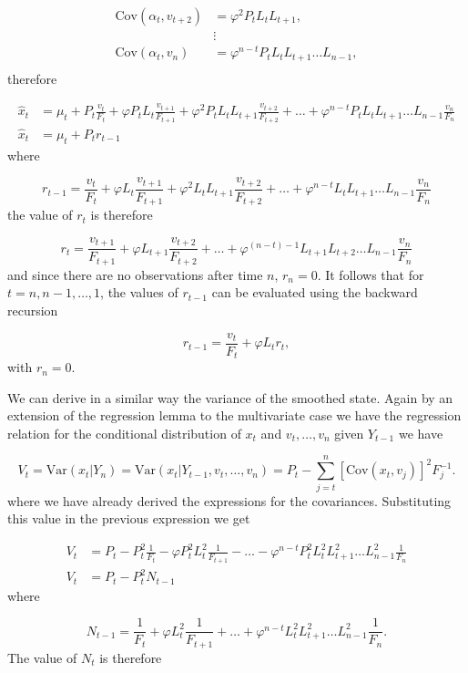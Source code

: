 \documentclass[11pt,a4paper]{article}
\newcommand{\var}{\mathrm{Var}}
\newcommand{\cov}{\mathrm{Cov}}
\begin{document}
\begin{align*}
   \cov(\alpha_t, v_{t+2}) &= \varphi^2 P_t L_t L_{t+1},\\
   &\vdots\\
   \cov(\alpha_t, v_n) &= \varphi^{n-t} P_t L_t L_{t+1} \dots L_{n-1},\\
\end{align*}
therefore

\begin{align*}
    \hat{x}_t &= \mu_t + P_t \frac{v_t}{F_t} + \varphi P_t L_t \frac{v_{t+1}}{F_{t+1}} + \varphi^2 P_t L_t L_{t+1} \frac{v_{t+2}}{F_{t+2}} + \dots + \varphi^{n-t} P_t L_t L_{t+1} \dots L_{n-1} \frac{v_n}{F_n}\\
    \hat{x}_t &= \mu_t + P_t r_{t-1}
\end{align*}
where

\[
    r_{t-1} = \frac{v_t}{F_t} + \varphi L_t \frac{v_{t+1}}{F_{t+1}} + \varphi^2 L_t L_{t+1} \frac{v_{t+2}}{F_{t+2}} + \dots + \varphi^{n-t} L_t L_{t+1} \dots L_{n-1} \frac{v_n}{F_n}
\]
the value of $r_t$ is therefore

\[
    r_{t} = \frac{v_{t+1}}{F_{t+1}} + \varphi L_{t+1} \frac{v_{t+2}}{F_{t+2}} + \dots + \varphi^{(n-t)-1}L_{t+1} L_{t+2} \dots L_{n-1} \frac{v_n}{F_n}
\]
and since there are no observations after time $n$, $r_n = 0$.
It follows that for $t = n, n-1, \dots ,1$, the values of $r_{t-1}$ can be evaluated using the backward recursion

\[
    r_{t-1} = \frac{v_t}{F_t} + \varphi L_t r_t, 
\]
with $r_n = 0$.

We can derive in a similar way the variance of the smoothed state. Again by an extension of the regression lemma to the multivariate case we have the regression relation for the conditional distribution of $x_t$ and $v_t, \dots, v_n$ given $Y_{t-1}$ we have

\[
    V_t = \var(x_t | Y_n) = \var(x_t | Y_{t-1}, v_t, \dots, v_n) = P_t - \sum^n_{j=t} [\cov(x_t, v_j)]^2F^{-1}_j.
\]
where we have already derived the expressions for the covariances. Substituting this value in the previous expression we get

\begin{align*}
    V_t &= P_t - P^2_t \frac{1}{F_t} - \varphi P^2_t L^2_t \frac{1}{F_{t+1}} - \dots - \varphi^{n-t} P^2_t L^2_t L^2_{t+1} \dots L^2_{n-1} \frac{1}{F_n}\\
    V_t &= P_t - P^2_t N_{t-1}
\end{align*}
where

\[
    N_{t-1} = \frac{1}{F_t} + \varphi L^2_t \frac{1}{F_{t+1}} + \dots + \varphi^{n-t} L^2_t L^2_{t+1} \dots L^2_{n-1} \frac{1}{F_n}.
\]
The value of $N_t$ is therefore
\end{document}
